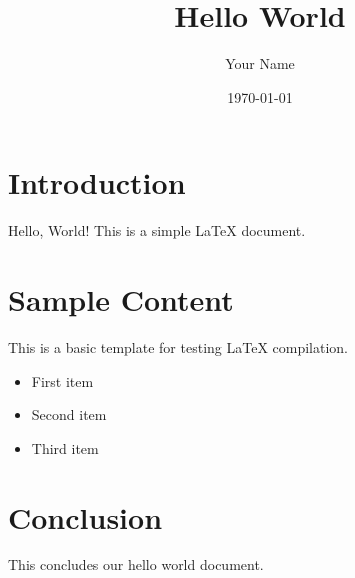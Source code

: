 \documentclass{article}
\title{Hello World}
\author{Your Name}
\date{\today}
\begin{document}
\maketitle

\section{Introduction}

Hello, World! This is a simple LaTeX document.

\section{Sample Content}

This is a basic template for testing LaTeX compilation.

\begin{itemize}
    \item First item
    \item Second item
    \item Third item
\end{itemize}

\section{Conclusion}

This concludes our hello world document.
\end{document}
